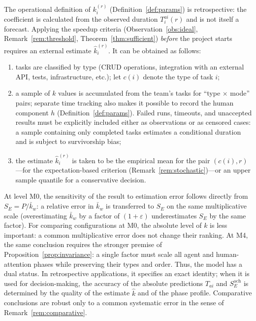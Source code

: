 \begin{remark}\label{rem:estimation}
The operational definition of $k_i^{(r)}$ (Definition~\ref{def:params}) is retrospective: the coefficient is calculated from the observed duration $T_i^{ai}(r)$ and is not itself a forecast. Applying the speedup criteria (Observation~\ref{obs:ideal}, Remark~\ref{rem:threshold}, Theorem~\ref{thm:sufficient}) \emph{before} the project starts requires an external estimate $\hat{k}_i^{(r)}$. It can be obtained as follows:
\begin{enumerate}
  \item tasks are classified by type (CRUD operations, integration with an external API, tests, infrastructure, etc.); let $c(i)$ denote the type of task $i$;
  \item a sample of $k$ values is accumulated from the team's tasks for ``type $\times$ mode'' pairs; separate time tracking also makes it possible to record the human component $h$ (Definition~\ref{def:params}). Failed runs, timeouts, and unaccepted results must be explicitly included either as observations or as censored cases: a sample containing only completed tasks estimates a conditional duration and is subject to survivorship bias;
  \item the estimate $\hat{k}_i^{(r)}$ is taken to be the empirical mean for the pair $(c(i), r)$---for the expectation-based criterion (Remark~\ref{rem:stochastic})---or an upper sample quantile for a conservative decision.
\end{enumerate}
At level M0, the sensitivity of the result to estimation error follows directly from $S_E = P/\bar{k}_w$: a relative error in $\bar{k}_w$ is transferred to $S_E$ on the same multiplicative scale (overestimating $\bar{k}_w$ by a factor of $(1+\varepsilon)$ underestimates $S_E$ by the same factor). For comparing configurations at M0, the absolute level of $k$ is less important: a common multiplicative error does not change their ranking. At M4, the same conclusion requires the stronger premise of Proposition~\ref{prop:invariance}: a single factor must scale all agent and human-attention phases while preserving their types and order. Thus, the model has a dual status. In retrospective applications, it specifies an exact identity; when it is used for decision-making, the accuracy of the absolute predictions $T_{ai}$ and $S_E^{\mathrm{ach}}$ is determined by the quality of the estimate $\hat{k}$ and of the phase profile. Comparative conclusions are robust only to a common systematic error in the sense of Remark~\ref{rem:comparative}.
\end{remark}

\ifdefined\FULLARTICLE
  \let\finishdocument\relax
\else
  \def\finishdocument{}
\fi
\finishdocument
